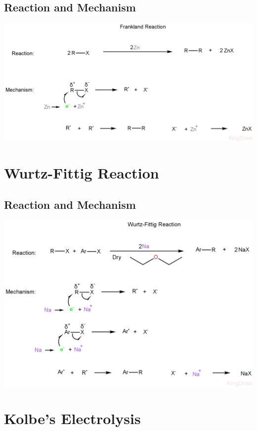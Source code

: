 \documentclass{article}
\begin{document}
\subsection{Reaction and Mechanism}
\begin{center}
    \includegraphics[scale=0.25]{FranklandReaction_1722166512574.JPEG}
\end{center}

\section{Wurtz-Fittig Reaction}
\subsection{Reaction and Mechanism}
\begin{center}
    \includegraphics[scale=0.25]{WurtzFittigReaction_1722166913964.JPEG}
\end{center}

\section{Kolbe's Electrolysis}
\end{document}

